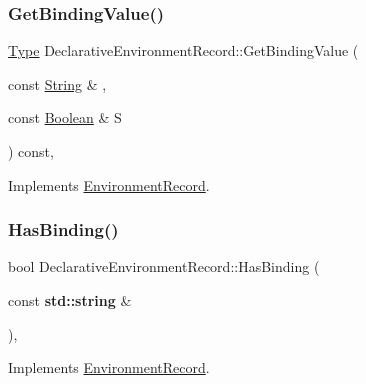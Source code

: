 \subsubsection{\texorpdfstring{Get\+Binding\+Value()}{GetBindingValue()}\hspace{0.1cm}{\footnotesize\ttfamily [2/2]}}
{\footnotesize\ttfamily \hyperlink{class_type}{Type} Declarative\+Environment\+Record\+::\+Get\+Binding\+Value (\begin{DoxyParamCaption}\item[{const \hyperlink{struct_string}{String} \&}]{,  }\item[{const \hyperlink{struct_boolean}{Boolean} \&}]{S }\end{DoxyParamCaption}) const\hspace{0.3cm}{\ttfamily [final]}, {\ttfamily [virtual]}}



Implements \hyperlink{struct_environment_record_a38f1293eb4b23d22c0ee37ffff58dbdb}{Environment\+Record}.

\mbox{\label{struct_declarative_environment_record_a4588f8af88b79f4317ced4dde8161813}} 
\subsubsection{\texorpdfstring{Has\+Binding()}{HasBinding()}\hspace{0.1cm}{\footnotesize\ttfamily [1/2]}}
{\footnotesize\ttfamily bool Declarative\+Environment\+Record\+::\+Has\+Binding (\begin{DoxyParamCaption}\item[{const \textbf{ std\+::string} \&}]{ }\end{DoxyParamCaption})\hspace{0.3cm}{\ttfamily [final]}, {\ttfamily [virtual]}}



Implements \hyperlink{struct_environment_record_aa9e241cd34f23e84ecaa19cf35657e9e}{Environment\+Record}.

\mbox{\label{struct_declarative_environment_record_a76b1f7c3be69f63d9711e256b81738d5}} 
